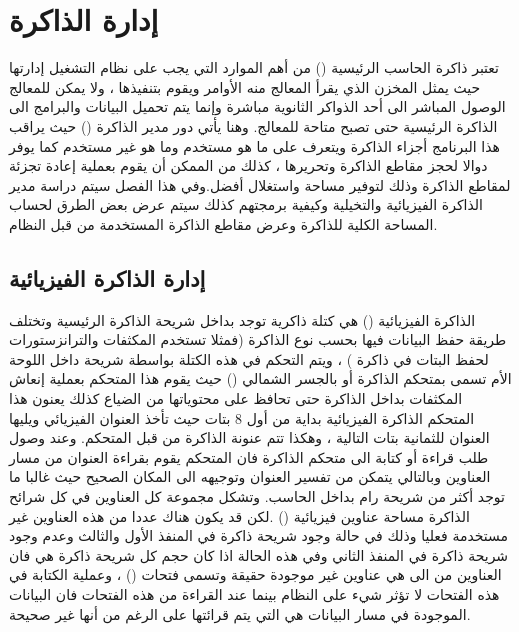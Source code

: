 \documentclass[document.tex]{subfiles}
\begin{document}
\chapter{إدارة الذاكرة}
تعتبر ذاكرة الحاسب الرئيسية () من أهم الموارد التي يجب على نظام التشغيل إدارتها حيث يمثل المخزن الذي يقرأ المعالج منه الأوامر ويقوم بتنفيذها ، ولا يمكن للمعالج الوصول المباشر الى أحد الذواكر الثانوية مباشرة وإنما يتم تحميل البيانات والبرامج الى الذاكرة الرئيسية حتى تصبح متاحة للمعالج. وهنا يأتي دور مدير الذاكرة () حيث يراقب هذا البرنامج أجزاء الذاكرة ويتعرف على ما هو مستخدم وما هو غير مستخدم كما يوفر دوالا لحجز مقاطع الذاكرة وتحريرها ، كذلك من الممكن أن يقوم بعملية إعادة تجزئة لمقاطع الذاكرة وذلك لتوفير مساحة واستغلال أفضل.وفي هذا الفصل سيتم دراسة مدير الذاكرة الفيزيائية والتخيلية وكيفية برمجتهم كذلك سيتم عرض بعض الطرق لحساب المساحة الكلية للذاكرة وعرض مقاطع الذاكرة المستخدمة من قبل النظام. 

\section{إدارة الذاكرة الفيزيائية }
الذاكرة الفيزيائية () هي كتلة ذاكرية توجد بداخل شريحة الذاكرة الرئيسية  وتختلف طريقة حفظ البيانات فيها بحسب نوع الذاكرة (فمثلا تستخدم المكثفات والترانزستورات لحفظ البتات في ذاكرة ) ، ويتم التحكم في هذه الكتلة بواسطة شريحة داخل اللوحة الأم تسمى بمتحكم الذاكرة أو بالجسر الشمالي () حيث يقوم هذا المتحكم بعملية إنعاش المكثفات بداخل الذاكرة حتى تحافظ على محتوياتها من الضياع كذلك يعنون هذا المتحكم الذاكرة الفيزيائية بداية من أول 8 بتات حيث تأخذ العنوان الفيزيائي  ويليها العنوان  للثمانية بتات التالية ، وهكذا تتم عنونة الذاكرة من قبل المتحكم. وعند وصول طلب قراءة أو كتابة الى متحكم الذاكرة فان المتحكم يقوم بقراءة العنوان من مسار العناوين وبالتالي يتمكن من تفسير العنوان وتوجيهه الى المكان الصحيح حيث غالبا ما توجد أكثر من شريحة رام بداخل الحاسب. وتشكل مجموعة كل العناوين في كل شرائح الذاكرة مساحة عناوين فيزيائية () .لكن قد يكون هناك عددا من هذه العناوين غير مستخدمة فعليا وذلك في حالة وجود شريحة ذاكرة في المنفذ الأول والثالث وعدم وجود شريحة ذاكرة في المنفذ الثاني وفي هذه الحالة اذا كان حجم كل شريحة ذاكرة هي  فان العناوين من  الى  هي عناوين غير موجودة حقيقة وتسمى فتحات () ، وعملية الكتابة في هذه الفتحات لا تؤثر شيء على النظام بينما عند القراءة من هذه الفتحات فان البيانات الموجودة في مسار البيانات هي التي يتم قرائتها على الرغم من أنها غير صحيحة. 
\end{document}
